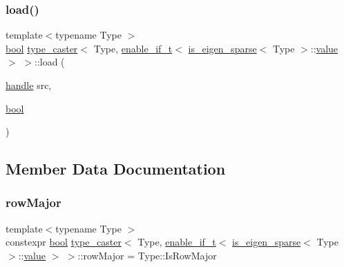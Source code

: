 \subsubsection{\texorpdfstring{load()}{load()}}
{\footnotesize\ttfamily template$<$typename Type $>$ \\
\mbox{\hyperlink{asdl_8h_af6a258d8f3ee5206d682d799316314b1}{bool}} \mbox{\hyperlink{classtype__caster}{type\+\_\+caster}}$<$ Type, \mbox{\hyperlink{detail_2common_8h_a012819c9e8b5e04872a271f50f8b8196}{enable\+\_\+if\+\_\+t}}$<$ \mbox{\hyperlink{eigen_8h_af680e1af5697a93b0f4fc037a2100fbc}{is\+\_\+eigen\+\_\+sparse}}$<$ Type $>$\+::\mbox{\hyperlink{_s_d_l__opengl__glext_8h_a8ad81492d410ff2ac11f754f4042150f}{value}} $>$ $>$\+::load (\begin{DoxyParamCaption}\item[{\mbox{\hyperlink{classhandle}{handle}}}]{src,  }\item[{\mbox{\hyperlink{asdl_8h_af6a258d8f3ee5206d682d799316314b1}{bool}}}]{ }\end{DoxyParamCaption})\hspace{0.3cm}{\ttfamily [inline]}}



\subsection{Member Data Documentation}
\mbox{\label{structtype__caster_3_01_type_00_01enable__if__t_3_01is__eigen__sparse_3_01_type_01_4_1_1value_01_4_01_4_a996a5fc0021f2e323928643ae036382e}} 
\subsubsection{\texorpdfstring{rowMajor}{rowMajor}}
{\footnotesize\ttfamily template$<$typename Type $>$ \\
constexpr \mbox{\hyperlink{asdl_8h_af6a258d8f3ee5206d682d799316314b1}{bool}} \mbox{\hyperlink{classtype__caster}{type\+\_\+caster}}$<$ Type, \mbox{\hyperlink{detail_2common_8h_a012819c9e8b5e04872a271f50f8b8196}{enable\+\_\+if\+\_\+t}}$<$ \mbox{\hyperlink{eigen_8h_af680e1af5697a93b0f4fc037a2100fbc}{is\+\_\+eigen\+\_\+sparse}}$<$ Type $>$\+::\mbox{\hyperlink{_s_d_l__opengl__glext_8h_a8ad81492d410ff2ac11f754f4042150f}{value}} $>$ $>$\+::row\+Major = Type\+::\+Is\+Row\+Major\hspace{0.3cm}{\ttfamily [static]}}




